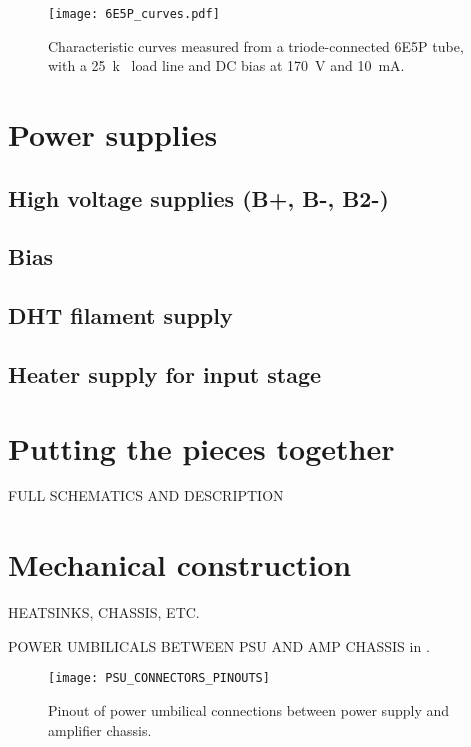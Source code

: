 \begin{figure}
\begin{center}
\texttt{[image: 6E5P\_curves.pdf]}
\caption{Characteristic curves measured from a triode-connected 6E5P tube, with a \SI{25}{k\Ohm} load line and DC bias at \SI{170}{V} and \SI{10}{mA}.}
\end{center}
\end{figure}


\section{Power supplies}

\subsection{High voltage supplies (B+, B-, B2-)}

\subsection{Bias}

\subsection{DHT filament supply}

\subsection{Heater supply for input stage}


\section{Putting the pieces together}

FULL SCHEMATICS AND DESCRIPTION




\section{Mechanical construction}

HEATSINKS, CHASSIS, ETC.

POWER UMBILICALS BETWEEN PSU AND AMP CHASSIS in .

\begin{figure}
\begin{center}
\texttt{[image: PSU\_CONNECTORS\_PINOUTS]}
\caption{Pinout of power umbilical connections between power supply and amplifier chassis.}
\end{center}
\end{figure}


